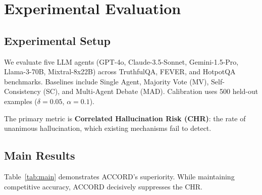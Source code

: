 \documentclass[conference]{IEEEtran}
\begin{document}
\section{Experimental Evaluation}
\label{sec:experiments}

\subsection{Experimental Setup}
We evaluate five LLM agents (GPT-4o, Claude-3.5-Sonnet, Gemini-1.5-Pro, Llama-3-70B, Mixtral-8x22B) across TruthfulQA, FEVER, and HotpotQA benchmarks. Baselines include Single Agent, Majority Vote (MV), Self-Consistency (SC), and Multi-Agent Debate (MAD). Calibration uses 500 held-out examples ($\delta = 0.05$, $\alpha = 0.1$). 

The primary metric is \textbf{Correlated Hallucination Risk (CHR)}: the rate of unanimous hallucination, which existing mechanisms fail to detect.

\subsection{Main Results}

Table~\ref{tab:main} demonstrates ACCORD's superiority. While maintaining competitive accuracy, ACCORD decisively suppresses the CHR.
\end{document}
